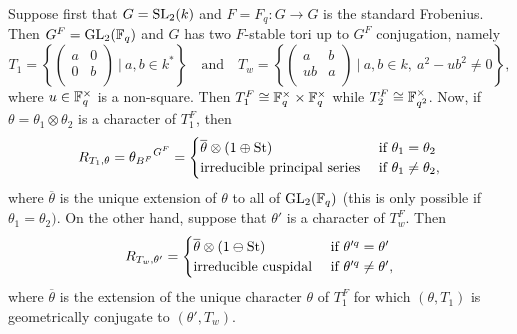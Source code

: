 \begin{example}
    Suppose first that $G=\mathrm{SL}_2(k)$ and $F=F_q:G\rightarrow G$ is the standard Frobenius. Then $G^F=\mathrm{GL}_2(\mathbb{F}_q)$ and $G$ has two $F$-stable tori up to $G^F$ conjugation, namely
    \begin{equation*}
        T_1=\left\{\begin{pmatrix}
            a & 0\\
            0 & b\\
        \end{pmatrix}\ |\ a,b\in k^*\right\}\quad\text{and}\quad T_w=\left\{\begin{pmatrix}
            a & b\\
            ub & a\\
        \end{pmatrix}\ |\ a,b\in k,\ a^2-ub^2\neq0\right\},
    \end{equation*}
    where $u\in\mathbb{F}_q^\times$ is a non-square. 
    Then $T_1^F\cong \mathbb{F}_q^\times\times\mathbb{F}_q^\times$ while $T_2^F\cong\mathbb{F}_{q^2}^\times$. Now, if $\theta=\theta_1\otimes\theta_2$ is a character of $T_1^F$, then 
    $$R_{T_1,\theta}={\theta_{B^F}}^{G^F}=\begin{cases}
        \overline{\theta}\otimes(1\oplus\mathrm{St}) &\text{ if } \theta_1=\theta_2\\
        \text{irreducible principal series} & \text{ if }\theta_1\neq\theta_2,
    \end{cases}$$
    where $\overline{\theta}$ is the unique extension of $\theta$ to all of $\mathrm{GL}_2(\mathbb{F}_q)$ (this is only possible if $\theta_1=\theta_2)$.
    On the other hand, suppose that $\theta'$ is a character of $T_w^F$. Then
    $$R_{T_w,\theta'}=\begin{cases}
        \overline{\theta}\otimes(1\ominus\mathrm{St}) &\text{ if } \theta'^q=\theta'\\
        \text{irreducible cuspidal} & \text{ if }\theta'^q\neq\theta',
    \end{cases}$$
    where $\overline{\theta}$ is the extension of the unique character $\theta$ of $T_1^F$ for which $(\theta,T_1)$ is geometrically conjugate to $(\theta',T_w)$.
\end{example}

